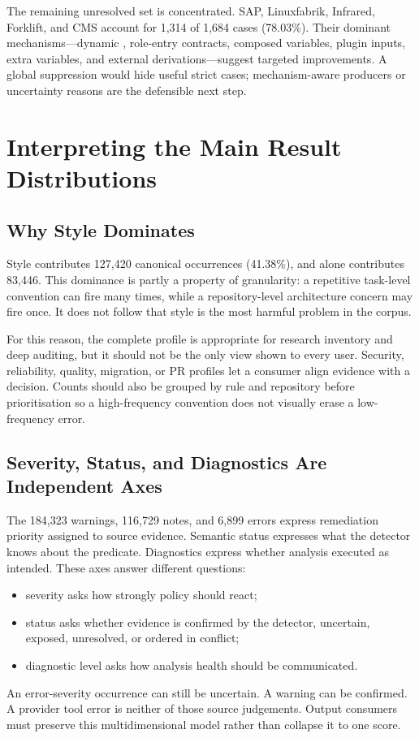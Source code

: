 The remaining unresolved set is concentrated. SAP, Linuxfabrik, Infrared,
Forklift, and CMS account for 1,314 of 1,684 cases (78.03\%). Their dominant
mechanisms---dynamic , role-entry contracts, composed
variables, plugin inputs, extra variables, and external derivations---suggest
targeted improvements. A global suppression would hide useful strict cases;
mechanism-aware producers or uncertainty reasons are the defensible next step.

\section{Interpreting the Main Result Distributions}
\subsection{Why Style Dominates}
Style contributes 127,420 canonical occurrences (41.38\%), and
 alone contributes 83,446. This dominance is partly a
property of granularity: a repetitive task-level convention can fire many
times, while a repository-level architecture concern may fire once. It does
not follow that style is the most harmful problem in the corpus.

For this reason, the complete  profile is appropriate for
research inventory and deep auditing, but it should not be the only view shown
to every user. Security, reliability, quality, migration, or PR profiles let a
consumer align evidence with a decision. Counts should also be grouped by rule
and repository before prioritisation so a high-frequency convention does not
visually erase a low-frequency error.

\subsection{Severity, Status, and Diagnostics Are Independent Axes}
The 184,323 warnings, 116,729 notes, and 6,899 errors express remediation
priority assigned to source evidence. Semantic status expresses what the
detector knows about the predicate. Diagnostics express whether analysis
executed as intended. These axes answer different questions:
\begin{itemize}
  \item severity asks how strongly policy should react;
  \item status asks whether evidence is confirmed by the detector, uncertain,
  exposed, unresolved, or ordered in conflict;
  \item diagnostic level asks how analysis health should be communicated.
\end{itemize}
An error-severity occurrence can still be uncertain. A warning can be
confirmed. A provider tool error is neither of those source judgements. Output
consumers must preserve this multidimensional model rather than collapse it to
one score.

